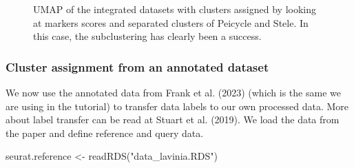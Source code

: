 \documentclass[
  letterpaper,
  DIV=11,
  numbers=noendperiod]{scrartcl}
\newenvironment{Shaded}{\begin{snugshade}}{\end{snugshade}}
\newcommand{\FunctionTok}[1]{\textcolor[rgb]{0.28,0.35,0.67}{#1}}
\newcommand{\NormalTok}[1]{\textcolor[rgb]{0.00,0.23,0.31}{#1}}
\newcommand{\OtherTok}[1]{\textcolor[rgb]{0.00,0.23,0.31}{#1}}
\newcommand{\StringTok}[1]{\textcolor[rgb]{0.13,0.47,0.30}{#1}}
\begin{document}
\begin{figure}[H]


\caption{\label{fig-umapsubcluster}UMAP of the integrated datasets with
clusters assigned by looking at markers scores and separated clusters of
Peicycle and Stele. In this case, the subclustering has clearly been a
success.}

\end{figure}%

\subsubsection{Cluster assignment from an annotated
dataset}\label{cluster-assignment-from-an-annotated-dataset}

We now use the annotated data from Frank et al. (2023) (which is the
same we are using in the tutorial) to transfer data labels to our own
processed data. More about label transfer can be read at Stuart et al.
(2019). We load the data from the paper and define reference and query
data.

\begin{Shaded}
\begin{Highlighting}[]
\NormalTok{seurat.reference }\OtherTok{\textless{}{-}} \FunctionTok{readRDS}\NormalTok{(}\StringTok{"data\_lavinia.RDS"}\NormalTok{)}
\end{Highlighting}
\end{Shaded}
\end{document}

